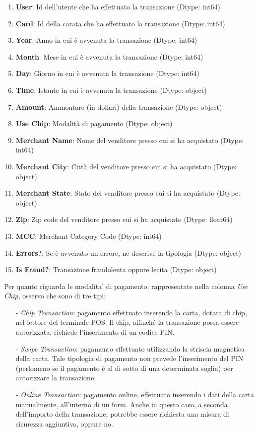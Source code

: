 \documentclass[]{article}
\begin{document}
        \begin{enumerate}[label=\roman*.]
            \item \textbf{User}: Id dell'utente che ha effettuato la transazione (Dtype: int64)
            \item \textbf{Card}: Id della carata che ha effettuato la transazione (Dtype: int64)
            \item \textbf{Year}: Anno in cui è avvenuta la transazione (Dtype: int64)
            \item \textbf{Month}: Mese in cui è avvenuta la transazione (Dtype: int64)
            \item \textbf{Day}: Giorno in cui è avvenuta la transazione (Dtype: int64)
            \item \textbf{Time}: Istante in cui è avvenuta la transazione (Dtype: object)
            \item \textbf{Amount}: Ammontare (in dollari) della transazione (Dtype: object)
            \item \textbf{Use Chip}: Modalità di pagamento (Dtype: object)
            \item \textbf{Merchant Name}: Nome del venditore presso cui si ha acquistato (Dtype: int64)
            \item \textbf{Merchant City}: Città del venditore presso cui si ha acquistato (Dtype: object)
            \item \textbf{Merchant State}: Stato del venditore presso cui si ha acquistato (Dtype: object)
            \item \textbf{Zip}: Zip code del venditore presso cui si ha acquistato (Dtype: float64)
            \item \textbf{MCC}: Merchant Category Code (Dtype: int64)
            \item \textbf{Errors?}: Se è avvenuto un errore, ne descrive la tipologia (Dtype: object)
            \item \textbf{Is Fraud?}: Transazione fraudolenta oppure lecita (Dtype: object)
        \end{enumerate}
        Per quanto riguarda le modalita' di pagamento, rappresentate nella colonna \textit{Use Chip}, osservo che sono di tre tipi:
        \begin{itemize}
            \item [-] \textit{Chip Transaction}: pagamento effettuato inserendo la carta, dotata di chip, nel lettore del terminale POS. Il chip, affinché la transazione possa essere autorizzata, richiede l'inserimento di un codice PIN.
            \item [-] \textit{Swipe Transaction}: pagamento effettuato utilizzando la striscia magnetica della carta. Tale tipologia di pagamento non prevede l'inserimento del PIN (perlomeno se il pagamento è al di sotto di una determinata soglia) per autorizzare la transazione.
            \item [-] \textit{Online Transaction}: pagamento online, effettuato inserendo i dati della carta manualmente, all'interno di un form. Anche in questo caso, a seconda dell'importo della transazione, potrebbe essere richiesta una misura di sicurezza aggiuntiva, oppure no.
        \end{itemize}
\end{document}
